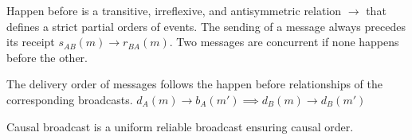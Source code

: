 

\begin{definition}
  Happen before is a transitive, irreflexive, and antisymmetric relation
  $\rightarrow$ that defines a strict partial orders of events. The sending of a
  message always precedes its receipt $s_{AB}(m) \rightarrow r_{BA}(m)$. Two
  messages are concurrent if none happens before the other.
\end{definition}

\begin{definition}
  The delivery order of messages follows the happen before relationships of the
  corresponding broadcasts.
  $d_A(m) \rightarrow b_A(m') \implies d_B(m) \rightarrow d_B(m')$
\end{definition}

\begin{definition}
  Causal broadcast is a uniform reliable broadcast ensuring causal order.
\end{definition}



%     



